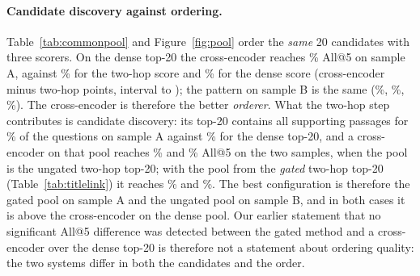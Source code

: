 \documentclass[a4paper,fleqn]{cas-sc}
\begin{document}
\paragraph{Candidate discovery against ordering.}
Table~\ref{tab:commonpool} and Figure~\ref{fig:pool} order the \emph{same} 20 candidates with three scorers. On the dense top-20 the cross-encoder reaches \PoolHADCE\% All@5 on sample A, against \PoolHADTwo\% for the two-hop score and \PoolHADDense\% for the dense score (cross-encoder minus two-hop \PoolHADCEvTwoD{} points, interval \PoolHADCEvTwoLo{} to \PoolHADCEvTwoHi{}); the pattern on sample B is the same (\PoolHBDCE\%, \PoolHBDTwo\%, \PoolHBDDense\%). The cross-encoder is therefore the better \emph{orderer}. What the two-hop step contributes is candidate discovery: its top-20 contains all supporting passages for \PoolHAHAllTwenty\% of the questions on sample A against \PoolHADAllTwenty\% for the dense top-20, and a cross-encoder on that pool reaches \PoolHAHCE\% and \PoolHBHCE\% All@5 on the two samples, when the pool is the ungated two-hop top-20; with the pool from the \emph{gated} two-hop top-20 (Table~\ref{tab:titlelink}) it reaches \GpuHACEGateAll\% and \GpuHBCEGateAll\%. The best configuration is therefore the gated pool on sample A and the ungated pool on sample B, and in both cases it is above the cross-encoder on the dense pool. Our earlier statement that no significant All@5 difference was detected between the gated method and a cross-encoder over the dense top-20 is therefore not a statement about ordering quality: the two systems differ in both the candidates and the order.
\end{document}
